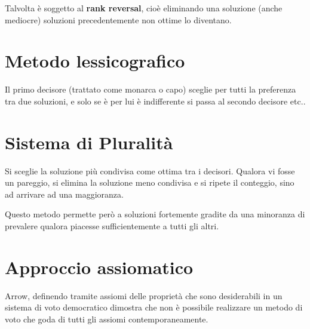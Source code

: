\documentclass[\main/main.tex]{subfiles}
\begin{document}
Talvolta è soggetto al \textbf{rank reversal}, cioè eliminando una soluzione (anche mediocre) soluzioni precedentemente non ottime lo diventano.

\section{Metodo lessicografico}
Il primo decisore (trattato come monarca o capo) sceglie per tutti la preferenza tra due soluzioni, e solo se è per lui è indifferente si passa al secondo decisore etc..

\section{Sistema di Pluralità}
Si sceglie la soluzione più condivisa come ottima tra i decisori. Qualora vi fosse un pareggio, si elimina la soluzione meno condivisa e si ripete il conteggio, sino ad arrivare ad una maggioranza.

Questo metodo permette però a soluzioni fortemente gradite da una minoranza di prevalere qualora piacesse sufficientemente a tutti gli altri.

\section{Approccio assiomatico}
Arrow, definendo tramite assiomi delle proprietà che sono desiderabili in un sistema di voto democratico dimostra che non è possibile realizzare un metodo di voto che goda di tutti gli assiomi contemporaneamente.
\end{document}
